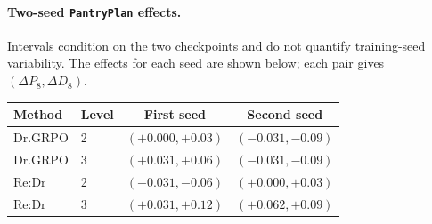 \begin{samepage}
\paragraph{Two-seed \texttt{PantryPlan} effects.} Intervals condition on the two checkpoints and do not quantify training-seed variability. The effects for each seed are shown below; each pair gives $(\Delta P_8,\Delta D_8)$.
\begin{center}\small
\begin{tabular}{llcc}
\toprule
Method & Level & First seed & Second seed \\
\midrule
Dr.GRPO & 2 & $(+0.000, +0.03)$ & $(-0.031, -0.09)$ \\
Dr.GRPO & 3 & $(+0.031, +0.06)$ & $(-0.031, -0.09)$ \\
Re:Dr & 2 & $(-0.031, -0.06)$ & $(+0.000, +0.03)$ \\
Re:Dr & 3 & $(+0.031, +0.12)$ & $(+0.062, +0.09)$ \\
\bottomrule
\end{tabular}
\end{center}
\end{samepage}